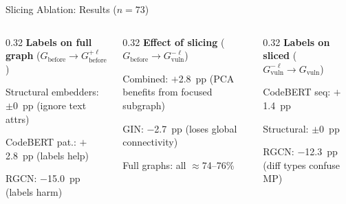 \documentclass[aspectratio=169,10pt]{beamer}
\begin{document}
\begin{frame}{Slicing Ablation: Results ($n{=}73$)}
  \vspace{0.3em}
  \begin{columns}[T]
  \begin{column}{0.32\textwidth}
    {\scriptsize\textbf{Labels on full graph} ($G_{\text{before}} \to G_{\text{before}}^{+\ell}$)}
    \begin{itemize}\setlength{\itemsep}{1pt}
      {\scriptsize
      \item Structural embedders: $\pm$0~pp (ignore text attrs)
      \item CodeBERT pat.: $+$2.8~pp (labels help)
      \item RGCN: $-$15.0~pp (labels harm)}
    \end{itemize}
  \end{column}
  \begin{column}{0.32\textwidth}
    {\scriptsize\textbf{Effect of slicing} ($G_{\text{before}} \to G_{\text{vuln}}^{-\ell}$)}
    \begin{itemize}\setlength{\itemsep}{1pt}
      {\scriptsize
      \item Combined: $+$2.8~pp (PCA benefits from focused subgraph)
      \item GIN: $-$2.7~pp (loses global connectivity)
      \item Full graphs: all $\approx$74--76\%}
    \end{itemize}
  \end{column}
  \begin{column}{0.32\textwidth}
    {\scriptsize\textbf{Labels on sliced} ($G_{\text{vuln}}^{-\ell} \to G_{\text{vuln}}$)}
    \begin{itemize}\setlength{\itemsep}{1pt}
      {\scriptsize
      \item CodeBERT seq: $+$1.4~pp
      \item Structural: $\pm$0~pp
      \item RGCN: $-$12.3~pp (diff types confuse MP)}
    \end{itemize}
  \end{column}
  \end{columns}
\end{frame}



\end{document}
